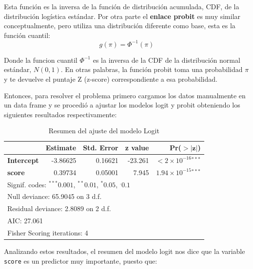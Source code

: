 Esta función es la inversa de la función de distribución acumulada, CDF, de la distribución logística estándar. Por otra parte el \textbf{enlace probit} es muy similar conceptualmente, pero utiliza una distribución diferente como base, esta es la función cuantil:
\begin{equation}
    g(\pi) = \Phi^{-1}(\pi)
\end{equation}
    
Donde la funcion cuantil $\Phi^{-1}$ es la inversa de la CDF de la distribución normal estándar, $N(0, 1)$. En otras palabras, la función probit toma una probabilidad $\pi$ y te devuelve el puntaje Z (z-score) correspondiente a esa probabilidad.

Entonces, para resolver el problema primero cargamos los datos manualmente en un data frame y se procedió a ajustar los modelos logit y probit obteniendo los siguientes resultados respectivamente:

\begin{table}[H]
\centering
\caption{Resumen del ajuste del modelo Logit}
\label{tab:logit_summary}
\begin{tabular}{lrrrr}
\hline
 & \textbf{Estimate} & \textbf{Std. Error} & \textbf{z value} & \textbf{Pr($\mathbf{>|z|}$)} \\
\hline
\textbf{Intercept} & -3.86625 & 0.16621 & -23.261 & $<2 \times 10^{-16}$$^{***}$ \\
\textbf{score}     & 0.39734  & 0.05001 & 7.945   & $1.94 \times 10^{-15}$$^{***}$ \\
\hline
\multicolumn{5}{l}{\footnotesize Signif. codes: $^{***}0.001$, $^{**}0.01$, $^{*}0.05$, $^{.}0.1$} \\
\multicolumn{5}{l}{\footnotesize Null deviance: 65.9045 on 3 d.f.} \\
\multicolumn{5}{l}{\footnotesize Residual deviance: 2.8089 on 2 d.f.} \\
\multicolumn{5}{l}{\footnotesize AIC: 27.061} \\
\multicolumn{5}{l}{\footnotesize Fisher Scoring iterations: 4} \\
\end{tabular}
\end{table}

Analizando estos resultados, el resumen del modelo logit nos dice que la variable \texttt{score} es un predictor muy importante, puesto que: 

